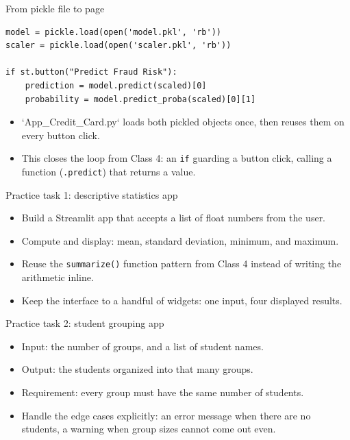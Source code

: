 \begin{frame}[fragile]{From pickle file to page}
\begin{lstlisting}[style=coursepython]
model = pickle.load(open('model.pkl', 'rb'))
scaler = pickle.load(open('scaler.pkl', 'rb'))

if st.button("Predict Fraud Risk"):
    prediction = model.predict(scaled)[0]
    probability = model.predict_proba(scaled)[0][1]
\end{lstlisting}
\begin{itemize}
\item `App_Credit_Card.py` loads both pickled objects once, then reuses them on every button click.
\item This closes the loop from Class 4: an \texttt{if} guarding a button click, calling a function (\texttt{.predict}) that returns a value.
\end{itemize}
\coursefooter
\end{frame}

\begin{frame}{Practice task 1: descriptive statistics app}
\begin{itemize}
\item Build a Streamlit app that accepts a list of float numbers from the user.
\item Compute and display: mean, standard deviation, minimum, and maximum.
\item Reuse the \texttt{summarize()} function pattern from Class 4 instead of writing the arithmetic inline.
\item Keep the interface to a handful of widgets: one input, four displayed results.
\end{itemize}
\coursefooter
\end{frame}

\begin{frame}{Practice task 2: student grouping app}
\begin{itemize}
\item Input: the number of groups, and a list of student names.
\item Output: the students organized into that many groups.
\item Requirement: every group must have the same number of students.
\item Handle the edge cases explicitly: an error message when there are no students, a warning when group sizes cannot come out even.
\end{itemize}
\coursefooter
\end{frame}

